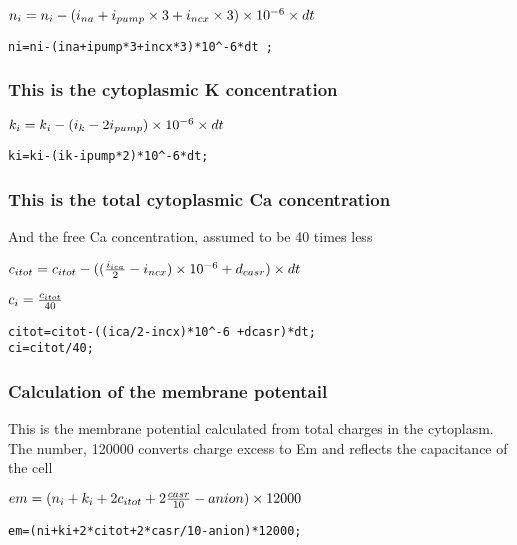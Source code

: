 \documentclass[11pt]{article}
\begin{document}
    \(\large {n_i} = n_{i}-(i_{na}+i_{pump} \times 3+i_{ncx} \times 3) \times 10^{-6} \times dt\)

    \texttt{ni=ni-(ina+ipump*3+incx*3)*10\^{}-6*dt\ ;}

    \subsubsection{This is the cytoplasmic K
concentration}\label{this-is-the-cytoplasmic-k-concentration}

    \(\large k_i = k_i - (i_k-2i_{pump}) \times 10^{-6} \times dt\)

    \texttt{ki=ki-(ik-ipump*2)*10\^{}-6*dt;}

    \subsubsection{This is the total cytoplasmic Ca
concentration}\label{this-is-the-total-cytoplasmic-ca-concentration}

And the free Ca concentration, assumed to be 40 times less

    \(\large c_{itot} = c_{itot}-((\frac{i_{ica}}{2}-i_{ncx}) \times 10^{-6} + d_{casr}) \times dt\)

\(\large c_i = \frac{c_{itot}}{40}\)

    \begin{verbatim}
citot=citot-((ica/2-incx)*10^-6 +dcasr)*dt;
ci=citot/40;
\end{verbatim}

    \subsubsection{Calculation of the membrane
potentail}\label{calculation-of-the-membrane-potentail}

This is the membrane potential calculated from total charges in the
cytoplasm. The number, 120000 converts charge excess to Em and reflects
the capacitance of the cell

    \(\large em = (n_i+k_i+2c_{itot}+ 2\frac{casr}{10}-anion) \times 12000\)

    \begin{verbatim}
em=(ni+ki+2*citot+2*casr/10-anion)*12000;
\end{verbatim}


    
    
    
    
\end{document}
